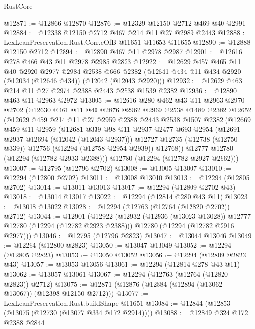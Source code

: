 \begin{lexlean}{RustCore}
\begin{coremodule}
@12871 := @12866 @12870
@12876 := @12329 @12150 @2712 @469 @40 @2991
@12884 := @12338 @12150 @2712 @467 @214 @11 @27 @2989 @2443
@12888 := LexLeanPreservation.Rust.Corr.eOfB @11651 @11653 @11655
@12890 := @12888 @12150 @2712
@12894 := @12890 @467 @11 @2978 @2987
@12901 := @12616 @278 @466 @43 @11 @2978 @2985 @2823
@12922 := @12629
    @457
    @465
    @11
    @40
    @2920
    @2977
    @2984
    @2538
    @666
    @2382
    (@12641 @434 @11 @434 @2920 (@12034 (@12646 @434)) (@12042 (@12043 @2920)))
@12932 := @12629 @463 @214 @11 @27 @2974 @2388 @2443 @2538 @1539 @2382
@12936 := @12890 @463 @11 @2963 @2972
@13005 := @12616
    @280
    @462
    @43
    @11
    @2963
    @2970
    @2702
    (@12630
      @461
      @11
      @40
      @2876
      @2962
      @2969
      @2538
      @1489
      @2382
      @12652
      (@12629
        @459
        @214
        @11
        @27
        @2959
        @2388
        @2443
        @2538
        @1507
        @2382
        (@12669
          @459
          @11
          @2959
          (@12681
            @339
            @98
            @11
            @2937
            @2477
            @693
            @2954
            (@12691 @2937 @12694 (@12042 (@12043 @2937)))
            @12727
            @12735
            (@12738 (@12750 @339))
            @12756
            (@12294 (@12758 @2954 @2939))
            @12768))
        @12777
        @12780
        (@12294 (@12782 @2933 @2388)))
      @12780
      (@12294 (@12782 @2927 @2962)))
@13007 := @12795 (@12796 @2702)
@13008 := @13005 @13007
@13010 := @12294 (@12800 @2702)
@13011 := @13008 @13010
@13013 := @12294 (@12805 @2702)
@13014 := @13011 @13013
@13017 := @12294 (@12809 @2702 @43)
@13018 := @13014 @13017
@13022 := @12294 (@12814 @280 @43 @11)
@13023 := @13018 @13022
@13028 := @12294 (@12763 (@12764 (@12820 @2702)) @2712)
@13044 := @12901
    (@12922
      (@12932 (@12936 (@13023 @13028)) @12777 @12780 (@12294 (@12782 @2923 @2388)))
      @12780
      (@12294 (@12782 @2916 @2977)))
@13046 := @12795 (@12796 @2823)
@13047 := @13044 @13046
@13049 := @12294 (@12800 @2823)
@13050 := @13047 @13049
@13052 := @12294 (@12805 @2823)
@13053 := @13050 @13052
@13056 := @12294 (@12809 @2823 @43)
@13057 := @13053 @13056
@13061 := @12294 (@12814 @278 @43 @11)
@13062 := @13057 @13061
@13067 := @12294 (@12763 (@12764 (@12820 @2823)) @2712)
@13075 := @12871 (@12876 (@12884 (@12894 (@13062 @13067)) (@12398 @12150 @2712)))
@13077 := LexLeanPreservation.Rust.buildShape @11651
@13084 := @12844 (@12853 (@13075 (@12730 (@13077 @334 @172 @2914))))
@13088 := @12849 @324 @172 @2388 @2844

\end{coremodule}
\end{lexlean}
